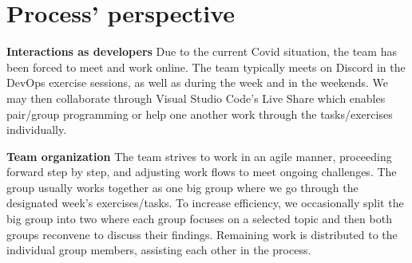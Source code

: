 \section{Process' perspective}

\textbf{Interactions as developers}\newline
  Due to the current Covid situation, the team has been forced to meet and work online. The team typically meets on Discord in the DevOps
  exercise sessions, as well as during the week and in the weekends. We may then collaborate through Visual Studio Code's Live Share which enables pair/group programming or help one another work through the tasks/exercises individually. 
  \newline
 
\textbf{Team organization}\newline
  The team strives to work in an agile manner, proceeding forward step by step, and adjusting work flows to meet ongoing challenges. The group usually works together as one big group where we go through the designated week's exercises/tasks. 
  To increase efficiency, we occasionally split the big group into two where each group focuses on a selected topic
  and then both groups reconvene to discuss their findings. Remaining work is distributed to the individual group members, assisting each other in the process.


